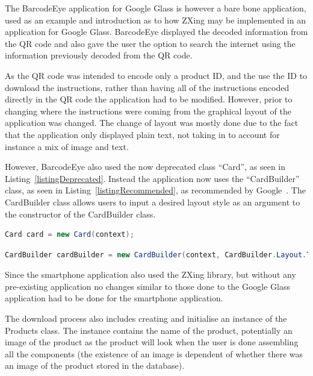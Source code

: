 The BarcodeEye application for Google Glass is however a bare bone application, used as an example and introduction as to how ZXing may be implemented in an application for Google Glass. BarcodeEye displayed the decoded information from the QR code and also gave the user the option to search the internet using the information previously decoded from the QR code.

As the QR code was intended to encode only a product ID, and the use the ID to download the instructions, rather than having all of the instructions encoded directly in the QR code the application had to be modified. However, prior to changing where the instructions were coming from the graphical layout of the application was changed. The change of layout was mostly done due to the fact that the application only displayed plain text, not taking in to account for instance a mix of image and text.

However, BarcodeEye also used the now deprecated class ``Card'', as seen in Listing~\ref{listingDeprecated}. Instead the application now uses the ``CardBuilder'' class, as seen in Listing~\ref{listingRecommended}, as recommended by Google~\cite{googleCard}. The CardBuilder class allows users to input a desired layout style as an argument to the constructor of the CardBuilder class.

\begin{lstlisting}[language=Java, caption={Instancing of the deprecated class Card}, label=listingDeprecated]
Card card = new Card(context);
\end{lstlisting}

\begin{lstlisting}[language=Java, caption={Instancing of the recommended class CardBuilder}, label=listingRecommended]
CardBuilder cardBuilder = new CardBuilder(context, CardBuilder.Layout.TITLE);
\end{lstlisting}

Since the smartphone application also used the ZXing library, but without any pre-existing application no changes similar to those done to the Google Glass application had to be done for the smartphone application.






The download process also includes creating and initialise an instance of the Products class. The instance contains the name of the product, potentially an image of the product as the product will look when the user is done assembling all the components (the existence of an image is dependent of whether there was an image of the product stored in the database).

